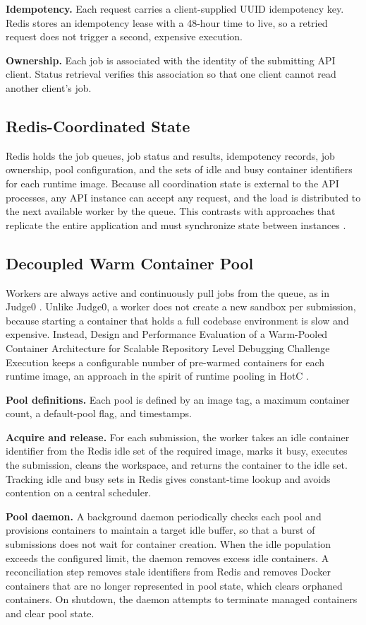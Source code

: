 \documentclass[conference]{IEEEtran}
\begin{document}
\textbf{Idempotency.} Each request carries a client-supplied UUID idempotency key. Redis stores an idempotency lease with a 48-hour time to live, so a retried request does not trigger a second, expensive execution.

\textbf{Ownership.} Each job is associated with the identity of the submitting API client. Status retrieval verifies this association so that one client cannot read another client's job.

\subsection{Redis-Coordinated State}
Redis holds the job queues, job status and results, idempotency records, job ownership, pool configuration, and the sets of idle and busy container identifiers for each runtime image. Because all coordination state is external to the API processes, any API instance can accept any request, and the load is distributed to the next available worker by the queue. This contrasts with approaches that replicate the entire application and must synchronize state between instances \cite{metaoj}.

\subsection{Decoupled Warm Container Pool}
Workers are always active and continuously pull jobs from the queue, as in Judge0 \cite{dosilovic2020}. Unlike Judge0, a worker does not create a new sandbox per submission, because starting a container that holds a full codebase environment is slow and expensive. Instead, Design and Performance Evaluation of a Warm-Pooled Container Architecture for Scalable Repository Level Debugging Challenge Execution keeps a configurable number of pre-warmed containers for each runtime image, an approach in the spirit of runtime pooling in HotC \cite{suo2021}.

\textbf{Pool definitions.} Each pool is defined by an image tag, a maximum container count, a default-pool flag, and timestamps.

\textbf{Acquire and release.} For each submission, the worker takes an idle container identifier from the Redis idle set of the required image, marks it busy, executes the submission, cleans the workspace, and returns the container to the idle set. Tracking idle and busy sets in Redis gives constant-time lookup and avoids contention on a central scheduler.

\textbf{Pool daemon.} A background daemon periodically checks each pool and provisions containers to maintain a target idle buffer, so that a burst of submissions does not wait for container creation. When the idle population exceeds the configured limit, the daemon removes excess idle containers. A reconciliation step removes stale identifiers from Redis and removes Docker containers that are no longer represented in pool state, which clears orphaned containers. On shutdown, the daemon attempts to terminate managed containers and clear pool state.
\end{document}
